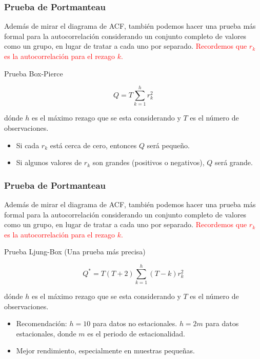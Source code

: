 \documentclass[10pt]{beamer}
\begin{document}
\begin{frame}
\frametitle{Prueba de Portmanteau}

Además de mirar el diagrama de ACF, también podemos hacer una prueba más formal para la autocorrelación considerando un conjunto completo de valores   como un grupo, en lugar de tratar a cada uno por separado. \textcolor{red}{Recordemos que $r_k$ es la autocorrelación para el rezago $k$.}
  
\begin{block}{Prueba Box-Pierce}

\begin{equation}
Q = T \sum_{k=1}^{h} r_k^2
\end{equation}

dónde $h$ es el máximo rezago que se esta considerando y $T$ es el número de observaciones.

\end{block} 

\pause

\begin{itemize}
\item Si cada $r_k$ está cerca de cero, entonces $Q$ será pequeño.
\item Si algunos valores de $r_k$ son grandes (positivos o negativos), $Q$ será grande.
\end{itemize}


\end{frame}







\begin{frame}
\frametitle{Prueba de Portmanteau}

Además de mirar el diagrama de ACF, también podemos hacer una prueba más formal para la autocorrelación considerando un conjunto completo de valores   como un grupo, en lugar de tratar a cada uno por separado. \textcolor{red}{Recordemos que $r_k$ es la autocorrelación para el rezago $k$.}
  
\begin{block}{Prueba Ljung-Box (Una prueba más precisa)}

\begin{equation}
Q^* = T(T+2) \sum_{k=1}^{h}(T-k) r_k^2
\end{equation}

dónde $h$ es el máximo rezago que se esta considerando y $T$ es el número de observaciones.

\end{block} 

\pause

\begin{itemize}
\item Recomendación: $h = 10$ para datos no estacionales. $h = 2m$ para datos estacionales, donde $m$ es el periodo de estacionalidad.
\item Mejor rendimiento, especialmente en muestras pequeñas.
\end{itemize}


\end{frame}
\end{document}
